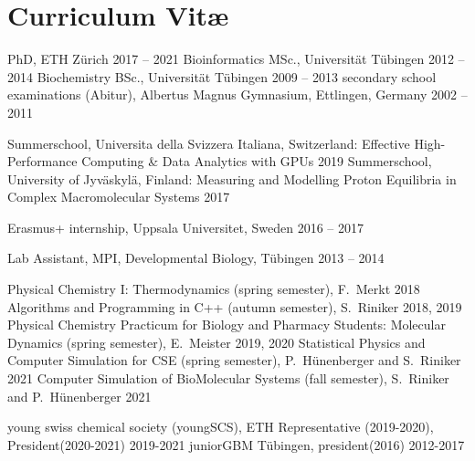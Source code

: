 \chapter{Curriculum Vit\ae}
\vspace{-1cm}
\begin{cvlist}
\end{cvlist}

\begin{cvlist}
\cventry
    {PhD, ETH Z\"{u}rich } %
    {2017 -- 2021} %
\cventry
    {Bioinformatics MSc., Universit\"{a}t T\"{u}bingen} %
    {2012 -- 2014} %
\cventry
    {Biochemistry BSc., Universit\"{a}t T\"{u}bingen} %
    {2009 -- 2013} %
\cventry
    {secondary school examinations (Abitur), Albertus Magnus Gymnasium, Ettlingen, Germany} %
    {2002 -- 2011} 
\end{cvlist}
\vspace{-0.5cm}
\begin{cvlist}
	\cventry
	{Summerschool,  Universita della Svizzera Italiana, Switzerland: Effective High-Performance Computing \& Data Analytics with GPUs} %
	{2019} %
	\cventry
	{Summerschool,  University of Jyväskylä, Finland: Measuring and Modelling Proton Equilibria in Complex Macromolecular Systems} %
	{2017} %
	
	\cventry
	{Erasmus+ internship, Uppsala Universitet, Sweden} %
	{2016 -- 2017} %
	
	\cventry
    {Lab Assistant, MPI, Developmental Biology, T\"{u}bingen} %
    {2013 -- 2014} %
\end{cvlist}
\vspace{-0.75cm}
\begin{cvlist}
	\cventry
	{Physical Chemistry I: Thermodynamics (spring semester), F.\ Merkt} %
	{2018} %
	\cventry
	{Algorithms and Programming in C++ (autumn semester), S.\ Riniker} %
	{2018, 2019} %
	\cventry
	{Physical Chemistry Practicum for Biology and Pharmacy Students: Molecular Dynamics (spring semester), E.\ Meister} %
	{2019, 2020} %
	\cventry
	{Statistical Physics and Computer Simulation for CSE (spring semester), P.\ H\"unenberger and S.\ Riniker} %
	{2021} %
	\cventry
	{Computer Simulation of BioMolecular Systems (fall semester), S.\ Riniker and P.\ H\"unenberger} %
	{2021} %
\end{cvlist}
\vspace{-0.75cm}
\begin{cvlist}
	\cventry
	{young swiss chemical society (youngSCS), ETH Representative (2019-2020), President(2020-2021)} %
	{2019-2021} %
	\cventry
	{juniorGBM T\"ubingen, president(2016)} %
	{2012-2017} %
	
\end{cvlist}

